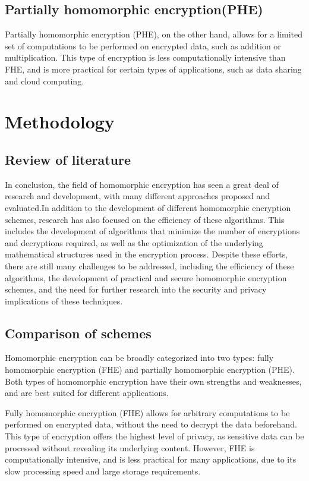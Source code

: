 \documentclass[conference]{IEEEtran}
\begin{document}
\subsection{Partially homomorphic encryption(PHE)}\label{AA}
Partially homomorphic encryption (PHE), on the other hand, allows for a limited set of computations to be performed on encrypted data, such as addition or multiplication. This type of encryption is less computationally intensive than FHE, and is more practical for certain types of applications, such as data sharing and cloud computing.
\section{Methodology}

\subsection{Review of literature}
In conclusion, the field of homomorphic encryption has seen a great deal of research and development, with many different approaches proposed and evaluated.In addition to the development of different homomorphic encryption schemes, research has also focused on the efficiency of these algorithms. This includes the development of algorithms that minimize the number of encryptions and decryptions required, as well as the optimization of the underlying mathematical structures used in the encryption process. Despite these efforts, there are still many challenges to be addressed, including the efficiency of these algorithms, the development of practical and secure homomorphic encryption schemes, and the need for further research into the security and privacy implications of these techniques.

\subsection{Comparison of schemes}
Homomorphic encryption can be broadly categorized into two types: fully homomorphic encryption (FHE) and partially homomorphic encryption (PHE). Both types of homomorphic encryption have their own strengths and weaknesses, and are best suited for different applications.

Fully homomorphic encryption (FHE) allows for arbitrary computations to be performed on encrypted data, without the need to decrypt the data beforehand. This type of encryption offers the highest level of privacy, as sensitive data can be processed without revealing its underlying content. However, FHE is computationally intensive, and is less practical for many applications, due to its slow processing speed and large storage requirements.
\end{document}
